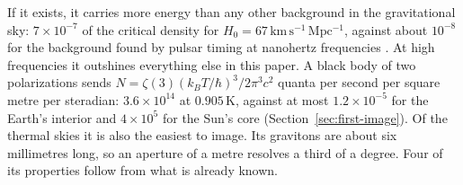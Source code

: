 If it exists, it carries more energy than any other background in the
gravitational sky: $7\times10^{-7}$ of the critical density for $H_0 = 67\,\mathrm{km\,s^{-1}\,Mpc^{-1}}$, against about
$10^{-8}$ for the background found by pulsar timing at nanohertz frequencies
\cite{NANOGrav2023}. At high frequencies it outshines everything else in this
paper. A black body of two polarizations sends
$N = \zeta(3)(k_BT/\hbar)^3/2\pi^3c^2$ quanta per second per square metre per
steradian: $3.6\times10^{14}$ at $0.905\,\mathrm{K}$, against at most $1.2\times10^{-5}$
for the Earth's interior and $4\times10^{5}$ for the Sun's core
(Section~\ref{sec:first-image}). Of the thermal skies it is also the easiest
to image. Its gravitons are about six millimetres long, so an aperture of a
metre resolves a third of a degree. Four of its properties follow from what is
already known.
